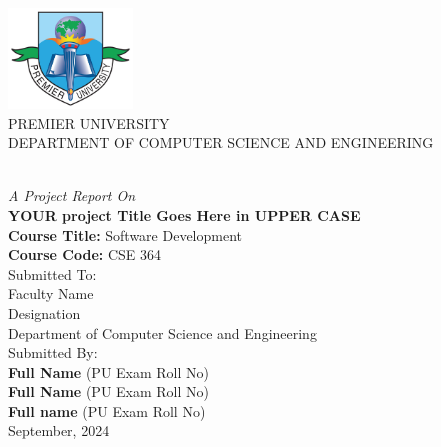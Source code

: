 
\thispagestyle{empty} %



{
	\thispagestyle{empty}
	\centering
	\normalsize
	  
        \includegraphics[width=1.3in]{Images/PUClogo.png}\\

	{PREMIER UNIVERSITY}\\
	{DEPARTMENT OF COMPUTER SCIENCE AND ENGINEERING}\\
	
	\\[1.5cm]
	{\textit{A Project Report On}\\
	{\bf YOUR project Title Goes Here in UPPER CASE}\\[1.5cm]

     {\bf Course Title:} Software Development\\
     {\bf Course Code:}  CSE 364\\[1.5cm]

        Submitted To:\\
	   Faculty Name \\
          Designation \\
          Department of Computer Science and Engineering\\[1.5cm]
    
	
	Submitted By:\\
	{\bf Full Name} (PU Exam Roll No)\\
        {\bf Full Name} (PU Exam Roll No)\\
	{\bf Full name} (PU Exam Roll No)\\[3.5cm]
	
	September, 2024
	
}

}

